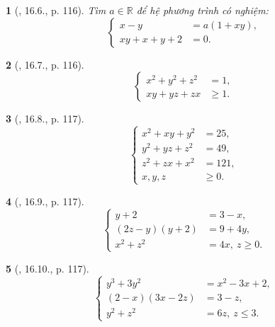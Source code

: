 \documentclass{article}
\newtheorem{baitoan}{}
\begin{document}
\begin{baitoan}[\cite{TLCT_THCS_Toan_9_dai_so}, 16.6., p. 116]
	Tìm $a\in\mathbb{R}$ để hệ phương trình có nghiệm:
	\begin{equation*}
		\left\{\begin{split}
			x - y &= a(1 + xy),\\
			xy + x + y + 2 &= 0.
		\end{split}\right.
	\end{equation*}
\end{baitoan}

\begin{baitoan}[\cite{TLCT_THCS_Toan_9_dai_so}, 16.7., p. 116]
	\begin{equation*}
		\left\{\begin{split}
			x^2 + y^2 + z^2 &= 1,\\
			xy + yz + zx&\ge1.
		\end{split}\right.
	\end{equation*}
\end{baitoan}

\begin{baitoan}[\cite{TLCT_THCS_Toan_9_dai_so}, 16.8., p. 117]
	\begin{equation*}
		\left\{\begin{split}
			x^2 + xy + y^2 &= 25,\\
			y^2 + yz + z^2 &= 49,\\
			z^2 + zx + x^2 &= 121,\\
			x,y,z&\ge0.
		\end{split}\right.
	\end{equation*}
\end{baitoan}

\begin{baitoan}[\cite{TLCT_THCS_Toan_9_dai_so}, 16.9., p. 117]
	\begin{equation*}
		\left\{\begin{split}
			y + 2 &= 3 - x,\\
			(2z - y)(y + 2) &= 9 + 4y,\\
			x^2 + z^2 &= 4x,\ z\ge0.
		\end{split}\right.
	\end{equation*}
\end{baitoan}

\begin{baitoan}[\cite{TLCT_THCS_Toan_9_dai_so}, 16.10., p. 117]
	\begin{equation*}
		\left\{\begin{split}
			y^3 + 3y^2 &= x^2 - 3x + 2,\\
			(2 - x)(3x - 2z) &= 3 - z,\\
			y^2 + z^2 &= 6z,\ z\le3.
		\end{split}\right.
	\end{equation*}
\end{baitoan}
\end{document}
